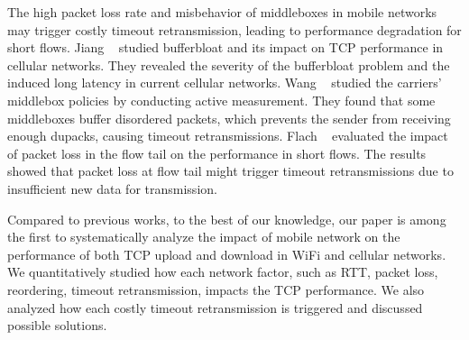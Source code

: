 The high packet loss rate and misbehavior of middleboxes in mobile networks may trigger costly timeout retransmission, leading to performance degradation for short flows. Jiang \etal~\cite{jiang2012tackling} studied bufferbloat and its impact on TCP performance in cellular networks. They revealed the severity of the bufferbloat problem and the induced long latency in current cellular networks. Wang \etal~\cite{Wang:2011:USM:2018436.2018479} studied the carriers' middlebox policies by conducting active measurement. They found that some middleboxes buffer disordered packets, which prevents the sender from receiving enough dupacks, causing timeout retransmissions. Flach \etal~\cite{flach2013reducing} evaluated the impact of packet loss in the flow tail on the performance in short flows. The results showed that packet loss at flow tail might trigger timeout retransmissions due to insufficient new data for transmission.

Compared to previous works, to the best of our knowledge, our paper is among the first to systematically analyze the impact of mobile network on the performance of both TCP upload and download in WiFi and cellular networks. We quantitatively studied how each network factor, such as RTT, packet loss, reordering, timeout retransmission, impacts the TCP performance. We also analyzed how each costly timeout retransmission is triggered and discussed possible solutions.